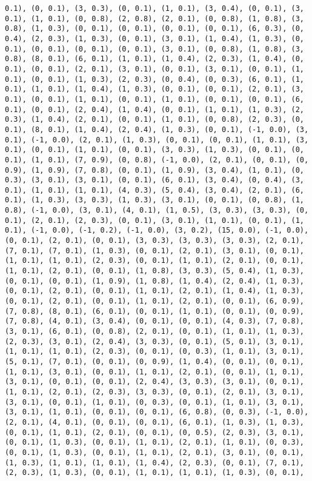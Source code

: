 \documentclass[11pt]{article}
\begin{document}
\begin{Verbatim}[commandchars=\\\{\}]
0.1), (0, 0.1), (3, 0.3), (0, 0.1), (1, 0.1), (3, 0.4), (0, 0.1), (3, 0.1), (1, 0.1), (0, 0.8), (2, 0.8), (2, 0.1), (0, 0.8), (1, 0.8), (3, 0.8), (1, 0.3), (0, 0.1), (0, 0.1), (0, 0.1), (0, 0.1), (6, 0.3), (0, 0.4), (2, 0.3), (1, 0.3), (0, 0.1), (3, 0.1), (1, 0.4), (1, 0.3), (0, 0.1), (0, 0.1), (0, 0.1), (0, 0.1), (3, 0.1), (0, 0.8), (1, 0.8), (3, 0.8), (8, 0.1), (6, 0.1), (1, 0.1), (1, 0.4), (2, 0.3), (1, 0.4), (0, 0.1), (0, 0.1), (2, 0.1), (3, 0.1), (0, 0.1), (3, 0.1), (0, 0.1), (1, 0.1), (0, 0.1), (1, 0.3), (2, 0.3), (0, 0.4), (0, 0.3), (6, 0.1), (1, 0.1), (1, 0.1), (1, 0.4), (1, 0.3), (0, 0.1), (0, 0.1), (2, 0.1), (3, 0.1), (0, 0.1), (1, 0.1), (0, 0.1), (1, 0.1), (0, 0.1), (0, 0.1), (6, 0.1), (0, 0.1), (2, 0.4), (1, 0.4), (0, 0.1), (1, 0.1), (1, 0.3), (2, 0.3), (1, 0.4), (2, 0.1), (0, 0.1), (1, 0.1), (0, 0.8), (2, 0.3), (0, 0.1), (8, 0.1), (1, 0.4), (2, 0.4), (1, 0.3), (0, 0.1), (-1, 0.0), (3, 0.1), (-1, 0.0), (2, 0.1), (1, 0.3), (0, 0.1), (0, 0.1), (1, 0.1), (3, 0.1), (0, 0.1), (1, 0.1), (0, 0.1), (3, 0.3), (1, 0.3), (0, 0.1), (0, 0.1), (1, 0.1), (7, 0.9), (0, 0.8), (-1, 0.0), (2, 0.1), (0, 0.1), (0, 0.9), (1, 0.9), (7, 0.8), (0, 0.1), (1, 0.9), (3, 0.4), (1, 0.1), (0, 0.3), (3, 0.1), (3, 0.1), (0, 0.1), (6, 0.1), (3, 0.4), (0, 0.4), (3, 0.1), (1, 0.1), (1, 0.1), (4, 0.3), (5, 0.4), (3, 0.4), (2, 0.1), (6, 0.1), (1, 0.3), (3, 0.3), (1, 0.3), (3, 0.1), (0, 0.1), (0, 0.8), (1, 0.8), (-1, 0.0), (3, 0.1), (4, 0.1), (1, 0.5), (3, 0.3), (3, 0.3), (0, 0.1), (2, 0.1), (2, 0.3), (0, 0.1), (3, 0.1), (1, 0.1), (0, 0.1), (1, 0.1), (-1, 0.0), (-1, 0.2), (-1, 0.0), (3, 0.2), (15, 0.0), (-1, 0.0), (0, 0.1), (2, 0.1), (0, 0.1), (3, 0.3), (3, 0.3), (3, 0.3), (2, 0.1), (7, 0.1), (7, 0.1), (1, 0.3), (0, 0.1), (2, 0.1), (3, 0.1), (0, 0.1), (1, 0.1), (1, 0.1), (2, 0.3), (0, 0.1), (1, 0.1), (2, 0.1), (0, 0.1), (1, 0.1), (2, 0.1), (0, 0.1), (1, 0.8), (3, 0.3), (5, 0.4), (1, 0.3), (0, 0.1), (0, 0.1), (1, 0.9), (1, 0.8), (1, 0.4), (2, 0.4), (1, 0.3), (0, 0.1), (2, 0.1), (0, 0.1), (1, 0.1), (2, 0.1), (1, 0.4), (1, 0.3), (0, 0.1), (2, 0.1), (0, 0.1), (1, 0.1), (2, 0.1), (0, 0.1), (6, 0.9), (7, 0.8), (8, 0.1), (6, 0.1), (0, 0.1), (1, 0.1), (0, 0.1), (0, 0.9), (7, 0.8), (4, 0.1), (3, 0.4), (0, 0.1), (0, 0.1), (4, 0.3), (7, 0.8), (3, 0.1), (6, 0.1), (0, 0.8), (2, 0.1), (0, 0.1), (1, 0.1), (1, 0.3), (2, 0.3), (3, 0.1), (2, 0.4), (3, 0.3), (0, 0.1), (5, 0.1), (3, 0.1), (1, 0.1), (1, 0.1), (2, 0.3), (0, 0.1), (0, 0.3), (1, 0.1), (3, 0.1), (5, 0.1), (7, 0.1), (0, 0.1), (0, 0.9), (1, 0.4), (0, 0.1), (0, 0.1), (1, 0.1), (3, 0.1), (0, 0.1), (1, 0.1), (2, 0.1), (0, 0.1), (1, 0.1), (3, 0.1), (0, 0.1), (0, 0.1), (2, 0.4), (3, 0.3), (3, 0.1), (0, 0.1), (1, 0.1), (2, 0.1), (2, 0.3), (3, 0.3), (0, 0.1), (2, 0.1), (3, 0.1), (3, 0.1), (0, 0.1), (1, 0.1), (0, 0.3), (0, 0.1), (1, 0.1), (3, 0.1), (3, 0.1), (1, 0.1), (0, 0.1), (0, 0.1), (6, 0.8), (0, 0.3), (-1, 0.0), (2, 0.1), (4, 0.1), (0, 0.1), (0, 0.1), (6, 0.1), (1, 0.3), (1, 0.3), (0, 0.1), (1, 0.1), (2, 0.1), (0, 0.1), (0, 0.5), (2, 0.3), (3, 0.1), (0, 0.1), (1, 0.3), (0, 0.1), (1, 0.1), (2, 0.1), (1, 0.1), (0, 0.3), (0, 0.1), (1, 0.3), (0, 0.1), (1, 0.1), (2, 0.1), (3, 0.1), (0, 0.1), (1, 0.3), (1, 0.1), (1, 0.1), (1, 0.4), (2, 0.3), (0, 0.1), (7, 0.1), (2, 0.3), (1, 0.3), (0, 0.1), (1, 0.1), (1, 0.1), (1, 0.3), (0, 0.1), 
\end{Verbatim}
\end{document}
